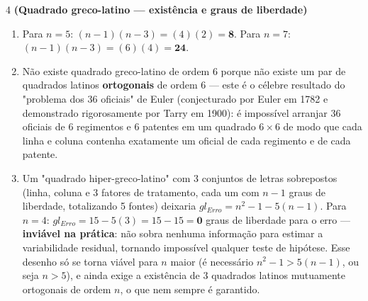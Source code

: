 \documentclass[11pt]{article}
\begin{document}
\begin{questao}{4} \textbf{(Quadrado greco-latino --- existência e graus de liberdade)}
\end{questao}
\begin{solucao}
\begin{enumerate}[label=(\alph*)]
  \item Para $n=5$: $(n-1)(n-3)=(4)(2)=\textbf{8}$. Para $n=7$: $(n-1)(n-3)=(6)(4)=\textbf{24}$.
  \item Não existe quadrado greco-latino de ordem 6 porque não existe um par de quadrados latinos
    \textbf{ortogonais} de ordem 6 — este é o célebre resultado do "problema dos 36 oficiais" de
    Euler (conjecturado por Euler em 1782 e demonstrado rigorosamente por Tarry em 1900): é
    impossível arranjar 36 oficiais de 6 regimentos e 6 patentes em um quadrado $6\times6$ de modo
    que cada linha e coluna contenha exatamente um oficial de cada regimento e de cada patente.
  \item Um "quadrado hiper-greco-latino" com 3 conjuntos de letras sobrepostos (linha, coluna e
    3 fatores de tratamento, cada um com $n-1$ graus de liberdade, totalizando 5 fontes) deixaria
    $gl_{Erro} = n^2-1-5(n-1)$. Para $n=4$: $gl_{Erro}=15-5(3)=15-15=\textbf{0}$ graus de
    liberdade para o erro — \textbf{inviável na prática}: não sobra nenhuma informação para
    estimar a variabilidade residual, tornando impossível qualquer teste de hipótese. Esse desenho
    só se torna viável para $n$ maior (é necessário $n^2-1 > 5(n-1)$, ou seja $n>5$), e ainda
    exige a existência de 3 quadrados latinos mutuamente ortogonais de ordem $n$, o que nem sempre
    é garantido.
\end{enumerate}
\end{solucao}
\end{document}
